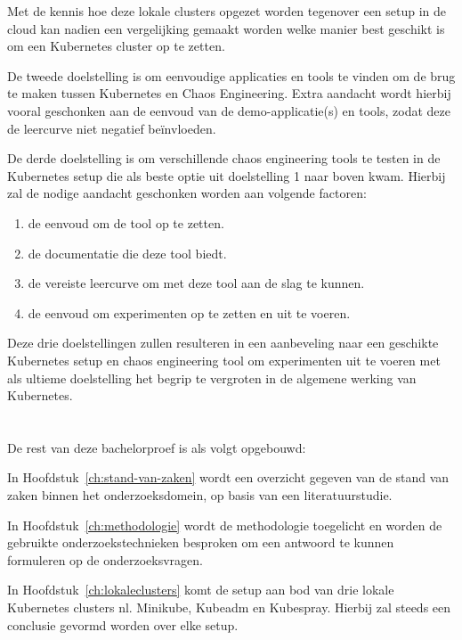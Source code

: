 Met de kennis hoe deze lokale clusters opgezet worden tegenover een setup in de cloud kan nadien een vergelijking gemaakt worden welke manier best geschikt is om een Kubernetes cluster op te zetten.

De tweede doelstelling is om eenvoudige applicaties en tools te vinden om de brug te maken tussen Kubernetes en Chaos Engineering. Extra aandacht wordt hierbij vooral geschonken aan de eenvoud van de demo-applicatie(s) en tools, zodat deze de leercurve niet negatief beïnvloeden.

De derde doelstelling is om verschillende chaos engineering tools te testen in de Kubernetes setup die als beste optie uit doelstelling 1 naar boven kwam. Hierbij zal de nodige aandacht geschonken worden aan volgende factoren:
\begin{enumerate}
    \item de eenvoud om de tool op te zetten.
    \item de documentatie die deze tool biedt.
    \item de vereiste leercurve om met deze tool aan de slag te kunnen.
    \item de eenvoud om experimenten op te zetten en uit te voeren. 
\end{enumerate} 

Deze drie doelstellingen zullen resulteren in een aanbeveling naar een geschikte Kubernetes setup en chaos engineering tool om experimenten uit te voeren met als ultieme doelstelling het begrip te vergroten in de algemene werking van Kubernetes.    

\section{}
\label{sec:opzet-bachelorproef}

De rest van deze bachelorproef is als volgt opgebouwd:

In Hoofdstuk~\ref{ch:stand-van-zaken} wordt een overzicht gegeven van de stand van zaken binnen het onderzoeksdomein, op basis van een literatuurstudie.

In Hoofdstuk~\ref{ch:methodologie} wordt de methodologie toegelicht en worden de gebruikte onderzoekstechnieken besproken om een antwoord te kunnen formuleren op de onderzoeksvragen.

In Hoofdstuk~\ref{ch:lokaleclusters} komt de setup aan bod van drie lokale Kubernetes clusters nl. Minikube, Kubeadm en Kubespray. Hierbij zal steeds een conclusie gevormd worden over elke setup.

